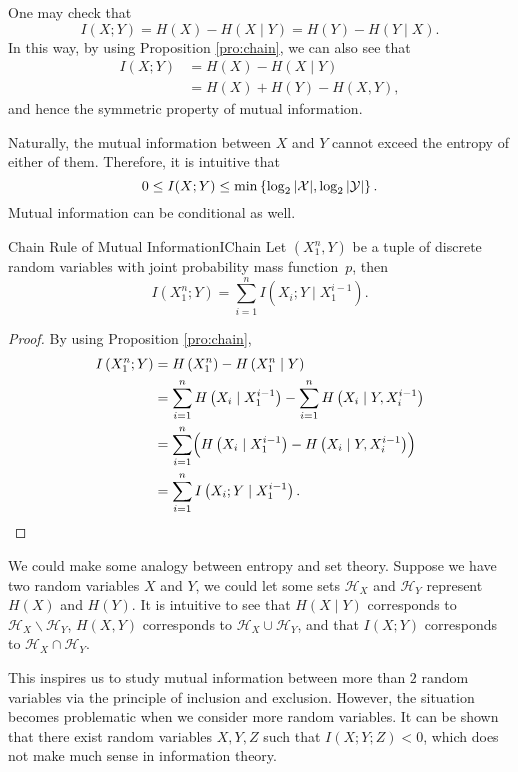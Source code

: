 \documentclass[math, code]{amznotes}
\theoremstyle{remark}
\begin{document}
One may check that 
\begin{equation*}
    I\left(X ; Y\right) = H\left(X\right) - H\left(X \mid Y\right) = H\left(Y\right) - H\left(Y \mid X\right).
\end{equation*}
In this way, by using Proposition \ref{pro:chain}, we can also see that 
\begin{align*}
    I\left(X ; Y\right) & = H\left(X\right) - H\left(X \mid Y\right) \\
    & = H\left(X\right) + H\left(Y\right) - H\left(X, Y\right),
\end{align*}
and hence the symmetric property of mutual information.

Naturally, the mutual information between $X$ and $Y$ cannot exceed the entropy of either of them. Therefore, it is intuitive that 
\begin{equation*}
    0 \leq I(X ; Y) \leq \min\left\{\log_2{\left\lvert {\mathcal{X}} \right\rvert}, \log_2{\left\lvert {\mathcal{Y}} \right\rvert}\right\}.
\end{equation*}
Mutual information can be conditional as well.
\begin{probox}{Chain Rule of Mutual Information}{IChain}
    Let $\left(X_1^n, Y\right)$ be a tuple of discrete random variables with joint probability mass function~$p$, then 
    \begin{equation*}
        I\left(X_1^n ; Y\right) = \sum_{i = 1}^{n}I\left(X_i ; Y \mid X_1^{i - 1}\right).
    \end{equation*}
    \tcblower
    \begin{proof}
        By using Proposition \ref{pro:chain},
        \begin{align*}
            I\left(X_1^n ; Y\right) & = H\left(X_1^n\right) - H\left(X_1^n \mid Y\right) \\
            & = \sum_{i = 1}^{n}H\left(X_i \mid X_1^{i - 1}\right) - \sum_{i = 1}^{n}H\left(X_i \mid Y, X_i^{i - 1}\right) \\
            & = \sum_{i = 1}^{n}\Bigl(H\left(X_i \mid X_1^{i - 1}\right) - H\left(X_i \mid Y, X_i^{i - 1}\right)\Bigr) \\
            & = \sum_{i = 1}^{n}I\left(X_i ; Y \mid X_1^{i - 1}\right).
        \end{align*}
    \end{proof}
\end{probox}
We could make some analogy between entropy and set theory. Suppose we have two random variables $X$ and $Y$, we could let some sets $\mathcal{H}_X$ and $\mathcal{H}_Y$ represent $H\left(X\right)$ and $H\left(Y\right)$. It is intuitive to see that $H\left(X \mid Y\right)$ corresponds to $\mathcal{H}_X \backslash \mathcal{H}_Y$, $H\left(X, Y\right)$ corresponds to $\mathcal{H}_X \cup \mathcal{H}_Y$, and that $I\left(X ; Y\right)$ corresponds to $\mathcal{H}_X \cap \mathcal{H}_Y$.

This inspires us to study mutual information between more than $2$ random variables via the principle of inclusion and exclusion. However, the situation becomes problematic when we consider more random variables. It can be shown that there exist random variables $X, Y, Z$ such that $I\left(X ; Y ; Z\right) < 0$, which does not make much sense in information theory.
\end{document}
